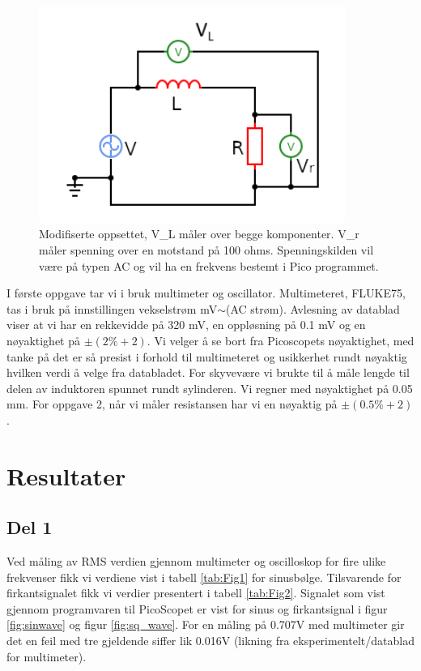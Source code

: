 \documentclass[norsk,a4paper,12pt]{article}
\newcommand{\figurewidth}{10cm}
\begin{document}
\begin{figure}[htbp]
    \centering
    \includegraphics[width=\figurewidth]{Figs/circuit.png}
    \caption{ Modifiserte oppsettet, V\_L måler over begge komponenter. V\_r måler spenning over en motstand på 100 ohms. Spenningskilden vil være på typen AC og vil ha en frekvens bestemt i Pico programmet. }
    \label{fig:krets_mod}
\end{figure}

I første oppgave tar vi i bruk multimeter og oscillator. Multimeteret, FLUKE75, tas i bruk på innstillingen vekselstrøm mV$\sim$(AC strøm). Avlesning av datablad viser at vi har en rekkevidde på 320 mV, en oppløsning på 0.1 mV og en nøyaktighet på $\pm(2\% + 2)$. Vi velger å se bort fra Picoscopets nøyaktighet, med tanke på det er så presist i forhold til multimeteret og usikkerhet rundt nøyaktig hvilken verdi å velge fra databladet.
For skyvevære vi brukte til å måle lengde til delen av induktoren spunnet rundt sylinderen. Vi regner med nøyaktighet på 0.05 mm. For oppgave 2, når vi måler resistansen har vi en nøyaktig på $\pm(0.5\% + 2)$. 




\section{Resultater}
\subsection{Del 1}
Ved måling av RMS verdien gjennom multimeter og oscilloskop for fire ulike frekvenser fikk vi verdiene vist i tabell \ref{tab:Fig1} for sinusbølge. Tilsvarende for firkantsignalet fikk vi verdier presentert i tabell \ref{tab:Fig2}. Signalet som vist gjennom programvaren til PicoScopet er vist for sinus og firkantsignal i figur \ref{fig:sinwave} og figur \ref{fig:sq_wave}. For en måling på 0.707V med multimeter gir det en feil med tre gjeldende siffer lik 0.016V (likning fra eksperimentelt/datablad for multimeter). 
\end{document}
